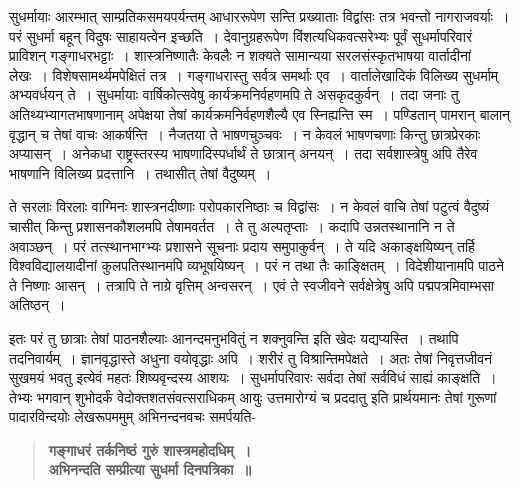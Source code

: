 सुधर्मायाः आरम्भात् साम्प्रतिकसमयपर्यन्तम् आधाररूपेण सन्ति प्रख्याताः विद्वांसः तत्र भवन्तो नागराजवर्याः~। परं सुधर्मा बहून् विदुषः साहायत्वेन इच्छति~। देवानुग्रहरूपेण विंशत्यधिकवत्सरेभ्यः पूर्वं सुधर्मापरिवारं प्राविशन् गङ्गाधरभट्टाः~। शास्त्रनिष्णातैः केवलैः न शक्यते सामान्यया सरलसंस्कृतभाषया वार्तादीनां लेखः~। विशेषसामर्थ्यमपेक्षितं तत्र~। गङ्गाधरास्तु सर्वत्र समर्थाः एव~। वार्तालेखादिकं विलिख्य सुधर्माम् अभ्यवर्धयन् ते~। सुधर्मायाः वार्षिकोत्सवेषु कार्यक्रमनिर्वहणमपि ते असकृदकुर्वन्~। तदा जनाः तु अतिथ्यभ्यागतभाषणानाम् अपेक्षया तेषां कार्यक्रमनिर्वहणशैल्यै एव स्निह्यन्ति स्म~। पण्डितान् पामरान् बालान् वृद्धान् च तेषां वाचः आकर्षन्ति~। नैजतया ते भाषणचुञ्चवः~। न केवलं भाषणचणाः किन्तु छात्रप्रेरकाः अप्यासन्~। अनेकधा राष्ट्रस्तरस्य भाषणादिस्पर्धार्थं ते छात्रान् अनयन्~। तदा सर्वशास्त्रेषु अपि तैरेव भाषणानि विलिख्य प्रदत्तानि~। तथासीत् तेषां वैदुष्यम्~। 

ते सरलाः विरलाः वाग्मिनः शास्त्रनदीष्णाः परोपकारनिष्ठाः च विद्वांसः~। न केवलं वाचि तेषां पटुत्वं वैदुष्यं चासीत् किन्तु प्रशासनकौशलमपि तेषामवर्तत~। ते तु अल्पतृप्ताः~। कदापि उन्नतस्थानानि न ते अवाञ्छन्~। परं तत्स्थानभाग्भ्यः प्रशासने सूचनाः प्रदाय समुपाकुर्वन्~। ते यदि अकाङ्क्षयिष्यन् तर्हि विश्वविद्यालयादीनां कुलपतिस्थानमपि व्यभूषयिष्यन्~। परं न तथा तैः काङ्क्षितम्~। विदेशीयानामपि पाठने ते निष्णाः आसन्~। तत्रापि ते नाग्रे वृत्तिम् अन्वसरन्~। एवं ते स्वजीवने सर्वक्षेत्रेषु अपि पद्मपत्रमिवाम्भसा अतिष्ठन्~। 

इतः परं तु छात्राः तेषां पाठनशैल्याः आनन्दमनुभवितुं न शक्नुवन्ति इति खेदः यद्यप्यस्ति~। तथापि तदनिवार्यम्~। ज्ञानवृद्धास्ते अधुना वयोवृद्धाः अपि~। शरीरं तु विश्रान्तिमपेक्षते~। अतः तेषां निवृत्तजीवनं सुखमयं भवतु इत्येवं महतः शिष्यवृन्दस्य आशयः~। सुधर्मापरिवारः सर्वदा तेषां सर्वविधं साह्यं काङ्क्षति~। तेभ्यः भगवान् शुभोदर्कं वेदोक्तशतसंवत्सराधिकम् आयुः उत्तमारोग्यं च प्रददातु इति प्रार्थयमानः तेषां गुरूणां पादारविन्दयोः लेखरूपममुम् अभिनन्दनवचः समर्पयति-

\begin{verse}
\textbf{गङ्गाधरं तर्कनिष्ठं गुरुं शास्त्रमहोदधिम्~।\\
अभिनन्दति सम्प्रीत्या सुधर्मा दिनपत्रिका~॥}
\end{verse}

\articleend

